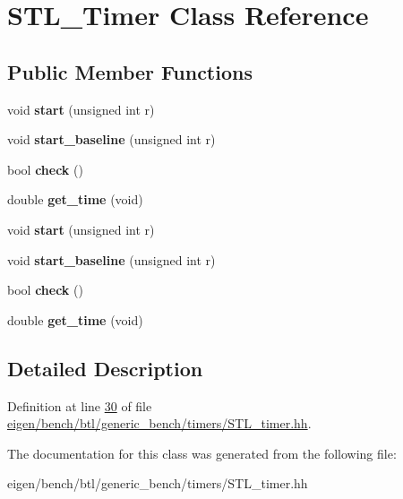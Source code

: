 \hypertarget{class_s_t_l___timer}{}\section{S\+T\+L\+\_\+\+Timer Class Reference}
\label{class_s_t_l___timer}
\subsection*{Public Member Functions}
\begin{DoxyCompactItemize}
\item 
\mbox{\label{class_s_t_l___timer_a8a846f3c68550604fb0635fcf13acd9a}} 
void {\bfseries start} (unsigned int r)
\item 
\mbox{\label{class_s_t_l___timer_ae8e9237dc39609429c5a76823d8ccac2}} 
void {\bfseries start\+\_\+baseline} (unsigned int r)
\item 
\mbox{\label{class_s_t_l___timer_aba5a9baee107eeb12f85f1ec8bc8a16d}} 
bool {\bfseries check} ()
\item 
\mbox{\label{class_s_t_l___timer_a98c13fdbab7162a00eb57b864c093fc4}} 
double {\bfseries get\+\_\+time} (void)
\item 
\mbox{\label{class_s_t_l___timer_a8a846f3c68550604fb0635fcf13acd9a}} 
void {\bfseries start} (unsigned int r)
\item 
\mbox{\label{class_s_t_l___timer_ae8e9237dc39609429c5a76823d8ccac2}} 
void {\bfseries start\+\_\+baseline} (unsigned int r)
\item 
\mbox{\label{class_s_t_l___timer_aba5a9baee107eeb12f85f1ec8bc8a16d}} 
bool {\bfseries check} ()
\item 
\mbox{\label{class_s_t_l___timer_a98c13fdbab7162a00eb57b864c093fc4}} 
double {\bfseries get\+\_\+time} (void)
\end{DoxyCompactItemize}


\subsection{Detailed Description}


Definition at line \hyperlink{eigen_2bench_2btl_2generic__bench_2timers_2_s_t_l__timer_8hh_source_l00030}{30} of file \hyperlink{eigen_2bench_2btl_2generic__bench_2timers_2_s_t_l__timer_8hh_source}{eigen/bench/btl/generic\+\_\+bench/timers/\+S\+T\+L\+\_\+timer.\+hh}.



The documentation for this class was generated from the following file\+:\begin{DoxyCompactItemize}
\item 
eigen/bench/btl/generic\+\_\+bench/timers/\+S\+T\+L\+\_\+timer.\+hh\end{DoxyCompactItemize}
